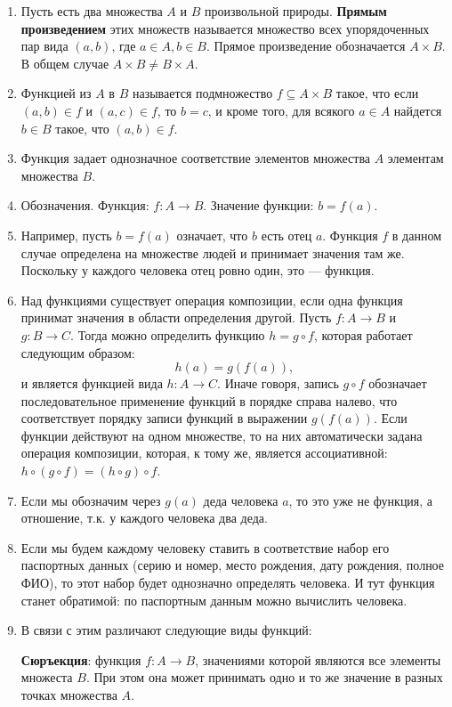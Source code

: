 \begin{enumerate}
\item Пусть есть два множества $A$ и $B$ произвольной природы. \textbf{Прямым произведением} этих множеств называется множество всех упорядоченных пар вида $(a,b)$, где $a\in A, b\in B$. Прямое произведение обозначается $A\times B$. В общем случае $A\times B\ne B\times A$.
\item Функцией из $A$ в $B$ называется подмножество $f\subseteq A\times B$ такое, что если $(a,b)\in f$ и $(a,c)\in f$, то $b=c$, и кроме того, для всякого $a\in A$ найдется $b\in B$ такое, что $(a,b)\in f$.
\item Функция задает однозначное соответствие элементов множества $A$ элементам множества $B$.
\item Обозначения. Функция: $f:A\to B$. Значение функции: $b=f(a)$.
\item Например, пусть $b=f(a)$ означает, что $b$ есть отец $a$. Функция $f$ в данном случае определена на множестве людей и принимает значения там же. Поскольку у каждого человека отец ровно один, это --- функция.
\item Над функциями существует операция композиции, если одна функция принимат значения в области определения другой. Пусть $f:A\to B$ и $g:B\to C$. Тогда можно определить функцию $h=g\circ f$, которая работает следующим образом: 
$$
h(a) = g(f(a)),
$$
и является функцией вида $h:A\to C$. Иначе говоря, запись $g\circ f$ обозначает последовательное применение функций в порядке справа налево, что соответствует порядку записи функций в выражении $g(f(a))$. Если функции действуют на одном множестве, то на них автоматически задана операция композиции, которая, к тому же, является ассоциативной: $h\circ (g\circ f)=(h\circ g)\circ f$.
\item Если мы обозначим через $g(a)$ деда человека $a$, то это уже не функция, а отношение, т.к. у каждого человека два деда.
\item Если мы будем каждому человеку ставить в соответствие набор его паспортных данных (серию и номер, место рождения, дату рождения, полное ФИО), то этот набор будет однозначно определять человека. И тут функция станет обратимой: по паспортным данным можно вычислить человека.
\item В связи с этим различают следующие виды функций:

\textbf{Сюръекция}: функция $f:A\to B$, значениями которой являются все элементы множеста $B$. При этом она может принимать одно и то же значение в разных точках множества $A$.


\end{enumerate}
